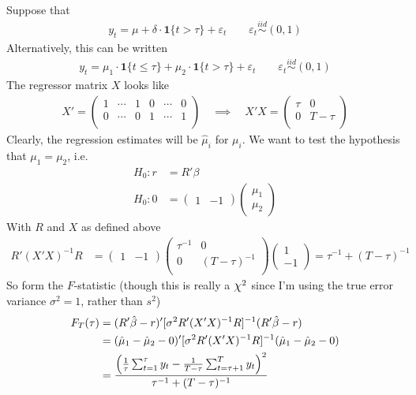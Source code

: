 \documentclass[12pt]{article}
\theoremstyle{plain}
\theoremstyle{definition}
\theoremstyle{remark}
\newcommand*{\Chi}{\mbox{\large$\chi$}} %
\newcommand{\iid}{\overset{iid}{\sim}}
\begin{document}
Suppose that
\begin{align*}
  y_t = \mu + \delta \cdot \mathbf{1}\{t>\tau\} + \varepsilon_t
  \qquad \varepsilon_t \iid(0,1)
\end{align*}
Alternatively, this can be written
\begin{align*}
  y_t = \mu_1\cdot \mathbf{1}\{t\leq\tau\}
  + \mu_2 \cdot \mathbf{1}\{t>\tau\} + \varepsilon_t
  \qquad \varepsilon_t \iid(0,1)
\end{align*}
The regressor matrix $X$ looks like
\begin{align*}
  X' =
  \begin{pmatrix}
    1 & \cdots & 1 & 0 & \cdots & 0 \\
    0 & \cdots & 0 & 1 & \cdots & 1 \\
  \end{pmatrix}
  \quad\implies\quad
  X'X =
  \begin{pmatrix}
    \tau & 0 \\
    0 & T-\tau\\
  \end{pmatrix}
\end{align*}
Clearly, the regression estimates will be $\hat{\mu}_i$ for $\mu_i$.
We want to test the hypothesis that $\mu_1=\mu_2$, i.e.
\begin{align*}
  H_0: r &= R'\beta \\
  H_0: 0 &=
  \begin{pmatrix}
    1 & -1
  \end{pmatrix}
  \begin{pmatrix}
    \mu_1 \\ \mu_2
  \end{pmatrix}
\end{align*}
With $R$ and $X$ as defined above
\begin{align*}
  R'(X'X)^{-1}R
  &=
  \begin{pmatrix}
    1 & -1
  \end{pmatrix}
  \begin{pmatrix}
    \tau^{-1} & 0 \\
    0 & (T-\tau)^{-1}\\
  \end{pmatrix}
  \begin{pmatrix}
    1 \\ -1
  \end{pmatrix}
  = \tau^{-1} + (T-\tau)^{-1}
\end{align*}
So form the $F$-statistic (though this is really a $\Chi^2$ since I'm
using the true error variance $\sigma^2=1$, rather than $s^2$)
\begin{align*}
  F_T(\tau)
  &=
  (R'\hat{\beta}-r)'
  [\sigma^2 R'(X'X)^{-1}R]^{-1}
  (R'\hat{\beta}-r)
  \\
  &=
  (\hat{\mu}_1-\hat{\mu}_2-0)'
  [\sigma^2 R'(X'X)^{-1}R]^{-1}
  (\hat{\mu}_1-\hat{\mu}_2-0)
  \\
  &=
  \frac{%
  \left(
  \frac{1}{\tau}\sum_{t=1}^\tau y_t
  -
  \frac{1}{T-\tau}\sum_{t=\tau+1}^T y_t
  \right)^2
  }{\tau^{-1} + (T-\tau)^{-1}}
\end{align*}
\end{document}
